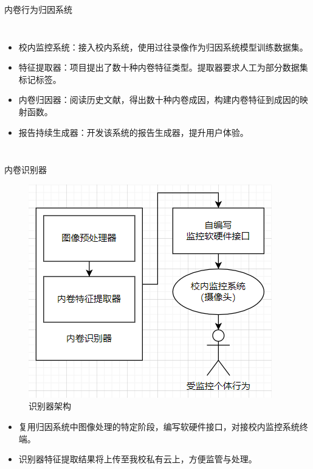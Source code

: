 \begin{frame}{内卷行为归因系统}
\begin{columns}
            \begin{itemize}
                \item 校内监控系统：接入校内系统，使用过往录像作为归因系统模型训练数据集。
                \item 特征提取器：项目提出了数十种内卷特征类型。提取器要求人工为部分数据集标记标签。
                \item 内卷归因器：阅读历史文献，得出数十种内卷成因，构建内卷特征到成因的映射函数。
                \item 报告持续生成器：开发该系统的报告生成器，提升用户体验。
            \end{itemize}
        \end{columns}
    \end{frame}

    \begin{frame}{内卷识别器}
        \begin{figure}
            \centering
            \includegraphics[width=.25\textwidth]{contents/figure/data-detector.png}
            \caption{识别器架构}
            \label{fig:data-detector}
        \end{figure}

        \begin{itemize}
            \item \small 复用归因系统中图像处理的特定阶段，编写软硬件接口，对接校内监控系统终端。
            \item \small 识别器特征提取结果将上传至我校私有云上，方便监管与处理。
        \end{itemize}
    \end{frame}

